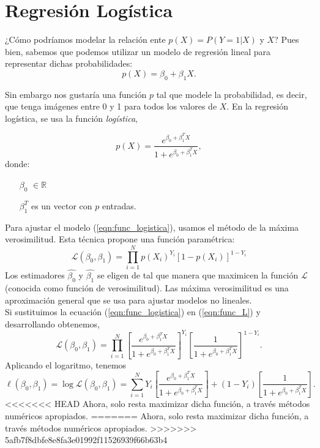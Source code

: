 \documentclass[11pt,letterpaper, reqno]{article}
\begin{document}
\section{Regresión Logística}

¿Cómo podríamos modelar la relación ente $p(X) = P(Y=1|X)$ y $X$? Pues bien, sabemos que podemos utilizar un modelo de regresión lineal para representar dichas probabilidades:
\begin{equation*}
p(X) = \beta_0 + \beta_1X.
\end{equation*}

Sin embargo nos gustaría una función $p$ tal que modele la probabilidad, es decir, que tenga imágenes entre 0 y 1 para todos los valores de $X$. En la regresión logística, se usa la función \textit{logística},

\begin{equation}
	\label{eqn:func_logistica}
	p(X) = \frac{e^{\beta_0 + \beta_1^{T} X}}{1+e^{\beta_0 + \beta_1^{T}X}},
\end{equation}
donde:
\begin{itemize}
	\item[$\beta_0$]$\in \mathbb{R}$
	\item[$\beta_1^T$] es un vector con $p$ entradas.
\end{itemize}
Para ajustar el modelo (\ref{eqn:func_logistica}), usamos el método de la máxima verosimilitud. Esta técnica propone una función paramétrica:
\begin{equation}
	\label{eqn:func_L}
	\mathcal{L}(\beta_{0}, \beta_{1}) = \prod_{i=1}^{N}p(X_i)^{Y_i}[1-p(X_{i})]^{1-Y_i}
\end{equation}
Los estimadores $\hat{\beta_0}$ y $\hat{\beta_1}$ se eligen de tal que manera que maximicen la función $\mathcal{L}$ (conocida como función de verosimilitud). Las máxima verosimilitud es una aproximación general que se usa para ajustar modelos no lineales.\\

Si sustituimos la ecuación (\ref{eqn:func_logistica}) en (\ref{eqn:func_L}) y desarrollando obtenemos,
$$
\mathcal{L}(\beta_{0}, \beta_{1}) =  \prod_{i=1}^{N} \left[ \frac{e^{\beta_0 + \beta_1^{T} X}}{1+e^{\beta_0 + \beta_1^{T}X}} \right]^{Y_i} \left[\frac{1}{1+e^{\beta_0 + \beta_1^{T}X}} \right]^{1-Y_i}.
$$
Aplicando el logaritmo, tenemos
$$
\ell(\beta_{0}, \beta_{1}) = \log\mathcal{L}(\beta_{0}, \beta_{1}) = \sum_{i=1}^{N} Y_i\left[ \frac{e^{\beta_0 + \beta_1^{T} X}}{1+e^{\beta_0 + \beta_1^{T}X}} \right] +  (1-Y_i)\left[\frac{1}{1+e^{\beta_0 + \beta_1^{T}X}} \right].
$$
<<<<<<< HEAD
Ahora, solo resta maximizar dicha función, a través métodos numéricos apropiados. 
=======
Ahora, solo resta maximizar dicha función, a través métodos numéricos apropiados.
>>>>>>> 5afb7f8dbfe8e8fa3e01992f11526939f66b63b4
\end{document}
